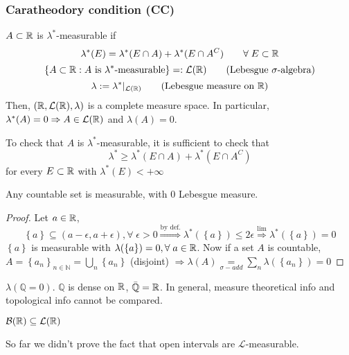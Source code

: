 \subsubsection*{Caratheodory condition (CC)}
\(A \subset \mathbb{R}\) is \(\lambda^*\)-measurable if 
\[
    \lambda^*(E) = \lambda^*(E \cap A) + \lambda^*(E \cap A^C) \qquad \forall \; E \subset \mathbb{R}
\]
\[
    \left\lbrace A \subset \real : A \mbox{ is }\lambda^*\mbox{-measurable} \right\rbrace =: \mathcal{L}(\real)
\tag*{(Lebesgue \(\sigalg\))}\]
\[
    \lambda := \lambda^* \vert_{\mathcal{L}(\real)}
\tag*{(Lebesgue measure on \(\real\))}\]
Then, \((\mathbb{R}, \mathcal{L}(\mathbb{R}), \lambda)\) is a complete measure space. In particular, \(\lambda^*(A) = 0 \Rightarrow A \in \mathcal{L}(\mathbb{R})\) and \(\lambda(A) = 0\).
\begin{remark}
    To check that \(A\) is \(\lambda^*\)-measurable, it is sufficient to check that 
    \[
        \lambda^* \geq \lambda^*(E \cap A) + \lambda^*(E \cap A^C)
    \] for every \(E \subset \mathbb{R}\) with \(\lambda^*(E) < +\infty\)
\end{remark}
\begin{proposition}
    Any countable set is measurable, with \(0\) Lebesgue measure.
\end{proposition}
\begin{proof}
    Let \(a \in \mathbb{R}\), \[\left\lbrace a \right\rbrace \subseteq (a-\epsilon, a+\epsilon), \forall \; \epsilon > 0 \overset{\mbox{by def.}}{\Rightarrow} \lambda^*(\left\lbrace a \right\rbrace) \leq 2\epsilon \overset{\mbox{lim}}{\Rightarrow} \lambda^*(\left\lbrace a \right\rbrace) = 0\]
    \(\left\lbrace a \right\rbrace\) is measurable with \(\lambda(\left\lbrace a \right\rbrace) = 0, \forall \; a \in \mathbb{R}\). Now if a set \(A\) is countable, \(A = \left\lbrace a_n \right\rbrace_{n \in \mathbb{N}} = \bigcup_n \left\lbrace a_n \right\rbrace\) (disjoint) \(\Rightarrow \lambda(A) \underset{\sigma-add}{=} \sum_n \lambda(\left\lbrace a_n \right\rbrace) = 0\)
\end{proof}
\begin{remark}
    \(\lambda(\mathbb{Q} = 0)\). \(\mathbb{Q}\) is dense on \(\mathbb{R}\), \(\bar{\mathbb{Q}} = \mathbb{R}\). In general, measure theoretical info and topological info cannot be compared.
\end{remark}
\begin{proposition}
    \(\mathcal{B}(\mathbb{R}) \subseteq \mathcal{L}(\mathbb{R})\)
\end{proposition}
\begin{remark}
    So far we didn't prove the fact that open intervals are \(\mathcal{L}\)-measurable.
\end{remark}
